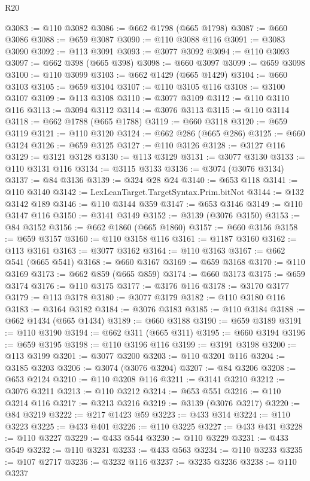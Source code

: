 \begin{lexlean}{R20}
\begin{coremodule}
@3083 := @110 @3082
@3086 := @662 @1798 (@665 @1798)
@3087 := @660 @3086
@3088 := @659 @3087
@3090 := @110 @3088 @116
@3091 := @3083 @3090
@3092 := @113 @3091
@3093 := @3077 @3092
@3094 := @110 @3093
@3097 := @662 @398 (@665 @398)
@3098 := @660 @3097
@3099 := @659 @3098
@3100 := @110 @3099
@3103 := @662 @1429 (@665 @1429)
@3104 := @660 @3103
@3105 := @659 @3104
@3107 := @110 @3105 @116
@3108 := @3100 @3107
@3109 := @113 @3108
@3110 := @3077 @3109
@3112 := @110 @3110 @116
@3113 := @3094 @3112
@3114 := @3076 @3113
@3115 := @110 @3114
@3118 := @662 @1788 (@665 @1788)
@3119 := @660 @3118
@3120 := @659 @3119
@3121 := @110 @3120
@3124 := @662 @286 (@665 @286)
@3125 := @660 @3124
@3126 := @659 @3125
@3127 := @110 @3126
@3128 := @3127 @116
@3129 := @3121 @3128
@3130 := @113 @3129
@3131 := @3077 @3130
@3133 := @110 @3131 @116
@3134 := @3115 @3133
@3136 := @3074 (@3076 @3134)
@3137 := @84 @3136
@3139 := @324 @28 @24
@3140 := @653 @118
@3141 := @110 @3140
@3142 := LexLeanTarget.TargetSyntax.Prim.bitNot
@3144 := @132 @3142 @189
@3146 := @110 @3144 @359
@3147 := @653 @3146
@3149 := @110 @3147 @116
@3150 := @3141 @3149
@3152 := @3139 (@3076 @3150)
@3153 := @84 @3152
@3156 := @662 @1860 (@665 @1860)
@3157 := @660 @3156
@3158 := @659 @3157
@3160 := @110 @3158 @116
@3161 := @1187 @3160
@3162 := @113 @3161
@3163 := @3077 @3162
@3164 := @110 @3163
@3167 := @662 @541 (@665 @541)
@3168 := @660 @3167
@3169 := @659 @3168
@3170 := @110 @3169
@3173 := @662 @859 (@665 @859)
@3174 := @660 @3173
@3175 := @659 @3174
@3176 := @110 @3175
@3177 := @3176 @116
@3178 := @3170 @3177
@3179 := @113 @3178
@3180 := @3077 @3179
@3182 := @110 @3180 @116
@3183 := @3164 @3182
@3184 := @3076 @3183
@3185 := @110 @3184
@3188 := @662 @1434 (@665 @1434)
@3189 := @660 @3188
@3190 := @659 @3189
@3191 := @110 @3190
@3194 := @662 @311 (@665 @311)
@3195 := @660 @3194
@3196 := @659 @3195
@3198 := @110 @3196 @116
@3199 := @3191 @3198
@3200 := @113 @3199
@3201 := @3077 @3200
@3203 := @110 @3201 @116
@3204 := @3185 @3203
@3206 := @3074 (@3076 @3204)
@3207 := @84 @3206
@3208 := @653 @2124
@3210 := @110 @3208 @116
@3211 := @3141 @3210
@3212 := @3076 @3211
@3213 := @110 @3212
@3214 := @653 @551
@3216 := @110 @3214 @116
@3217 := @3213 @3216
@3219 := @3139 (@3076 @3217)
@3220 := @84 @3219
@3222 := @217 @1423 @59
@3223 := @433 @314
@3224 := @110 @3223
@3225 := @433 @401
@3226 := @110 @3225
@3227 := @433 @431
@3228 := @110 @3227
@3229 := @433 @544
@3230 := @110 @3229
@3231 := @433 @549
@3232 := @110 @3231
@3233 := @433 @563
@3234 := @110 @3233
@3235 := @107 @2717
@3236 := @3232 @116
@3237 := @3235 @3236
@3238 := @110 @3237

\end{coremodule}
\end{lexlean}
